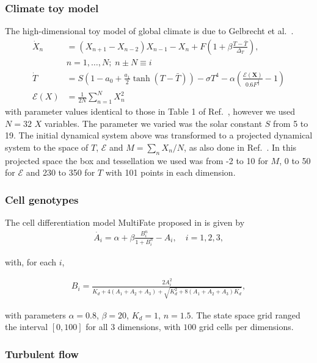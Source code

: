 \documentclass[%
 aip,
 amsmath,amssymb,
 reprint,%
]{revtex4-1}
\begin{document}
\subsubsection*{Climate toy model} The high-dimensional toy model of global climate is due to Gelbrecht et al.~\cite{Gelbrecht2021}. 
\begin{align*}
    \dot{X}_n &= (X_{n+1} - X_{n-2})X_{n-1} - X_n + F \left(1 + \beta \frac{T - \bar{T}}{\Delta_T}\right) ,  \\ &  n = 1, \dots, N; \;  n\pm N \equiv i \\ 
    \dot{T} &= S\left(1 - a_0 + \frac{a_1}{2}\tanh \left( T - \bar{T}\right)\right) - \sigma T^4 - \alpha\left( \frac{\mathcal{E} (\mathbf{X})}{0.6 F^{\tfrac{4}{3}}} - 1 \right) \\
    \mathcal{E}(X) &= \frac{1}{2N}\sum_{n=1}^{N}X_n^2
\end{align*}
with parameter values identical to those in Table 1 of Ref.~\cite{Gelbrecht2021}, however we used $N=32$ $X$ variables. The parameter we varied was the solar constant $S$ from 5 to 19. The initial dynamical system above was transformed to a projected dynamical system to the space of $T$, $\mathcal{E}$ and $M = \sum_n X_{n}/N$, as also done in Ref.~\cite{Gelbrecht2021}. In this projected space the box and tessellation we used was from -2 to 10 for $M$, 0 to 50 for $\mathcal{E}$ and 230 to 350 for $T$ with 101 points in each dimension.



\subsubsection*{Cell genotypes}
The cell differentiation model MultiFate proposed in \cite{zhu2022synthetic} is given by 
\begin{align*}
    \dot{A_i} = \alpha + \beta \frac{ B_i^n }{ 1 + B_i^n } - A_i, \quad i = 1, 2, 3, 
\end{align*}

with, for each $i$,

\begin{align*}
    B_i = \frac{2A_i^2}{ K_d + 4(A_1 + A_2 + A_3) + \sqrt{ K_d^2 + 8(A_1 + A_2 + A_3) K_d } }, 
\end{align*}

with parameters $\alpha = 0.8$, $\beta = 20$, $K_d = 1$, $n = 1.5$. 
The state space grid ranged the interval $[0, 100]$ for all $3$ dimensions, with $100$ grid cells per dimensions.

\subsubsection*{Turbulent flow}
\end{document}
